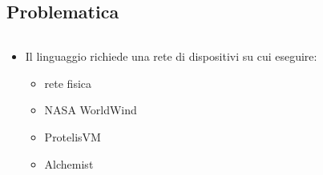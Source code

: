     \subsection{Problematica}

    \begin{frame}{\insertsectionhead}{\insertsubsectionhead}
      \begin{columns}
        \begin{column}{.6\textwidth}
          \begin{alertblock}{\insertsubsectionhead}
            \begin{itemize}
              \item<1->
                Il linguaggio richiede una rete di dispositivi su cui eseguire:
                \begin{itemize}
                  \item<2-> rete fisica
                  \item<3-> NASA WorldWind
                  \item<4-> ProtelisVM
                  \item<5-> Alchemist
                \end{itemize}
            \end{itemize}
          \end{alertblock}
        \end{column}
        \begin{column}{.35\textwidth}
          \begin{figure}
            \centering
\end{figure}
\end{column}
\end{columns}
\end{frame}
